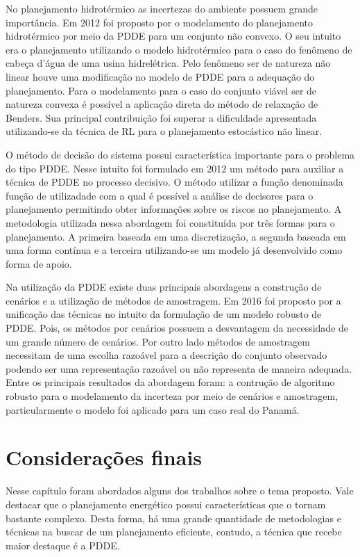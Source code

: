 No planejamento  hidrot\'ermico as incertezas do ambiente possuem grande import\^ancia. Em 2012 foi proposto por
\cite{torres}  o
modelamento do planejamento hidrot\'ermico por meio da PDDE para um conjunto n\~ao convexo. O seu intuito era o
planejamento
utilizando o modelo hidrot\'ermico para o caso do fen\^omeno de cabe\c ca d'\'agua de uma usina hidrel\'etrica. Pelo fen\^omeno ser
de natureza n\~ao linear houve uma modifica\c c\~ao no modelo de PDDE para a adequa\c c\~ao do planejamento. Para o
modelamento para o caso do conjunto vi\'avel ser de natureza convexa \'e poss\'ivel a aplica\c c\~ao direta do m\'etodo
de relaxa\c c\~ao de Benders. Sua principal contribui\c c\~ao foi superar a dificuldade apresentada utilizando-se da
t\'ecnica de RL para o planejamento estoc\'astico n\~ao linear. 

O m\'etodo de decis\~ao do sistema possui caracter\'istica importante para o problema do tipo PDDE. Nesse intuito foi
formulado em 2012 \cite{vitor} um m\'etodo para auxiliar a t\'ecnica de PDDE no processo decisivo. O m\'etodo
utilizar a fun\c c\~ao denominada fun\c c\~ao de utilizadade com a qual \'e poss\'ivel a an\'alise de decisores para o
planejamento permitindo obter informa\c c\~oes sobre os riscos no planejamento. A metodologia utilizada nessa abordagem
foi constitu\'ida por tr\^es formas para o planejamento. A primeira baseada em uma discretiza\c c\~ao, a segunda baseada
em uma forma cont\'inua e a terceira utilizando-se um modelo j\'a desenvolvido como forma de apoio.

Na utiliza\c c\~ao da PDDE existe duas principais abordagens a constru\c c\~ao de cen\'arios e a utiliza\c
c\~ao de m\'etodos de amostragem. Em 2016 foi proposto por \cite{Reben} a unifica\c c\~ao das t\'ecnicas no intuito da
formula\c c\~ao de um modelo robusto de PDDE. Pois, os m\'etodos por cen\'arios possuem a desvantagem da necessidade de
um grande n\'umero de cen\'arios. Por outro lado m\'etodos de amostragem necessitam de uma escolha razo\'avel para a
descri\c c\~ao do conjunto observado podendo ser uma representa\c c\~ao razo\'avel ou  n\~ao representa de maneira
adequada. Entre os principais resultados da abordagem foram: a contru\c c\~ao de algoritmo robusto para o modelamento da
incerteza por meio de cen\'arios e amostragem, particularmente o modelo foi aplicado para um caso real do Panam\'a.

\section{Considera\c c\~oes finais}
Nesse cap\'itulo foram abordados alguns dos trabalhos sobre o tema proposto. Vale destacar que o planejamento energ\'etico possui
caracter\'isticas que o tornam bastante complexo. Desta forma, h\'a uma grande quantidade de metodologias e t\'ecnicas na
buscar de um planejamento eficiente, contudo, a t\'ecnica que recebe maior destaque \'e a PDDE.  
